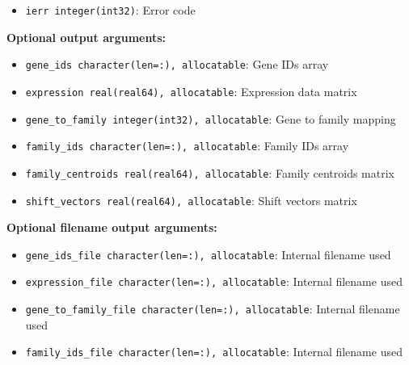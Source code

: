 \begin{enumerate}
\begin{itemize}
\begin{itemize}
                    \item \texttt{ierr integer(int32)}: Error code
                  \end{itemize}
                  \textbf{Optional output arguments:}
                  \begin{itemize}
                    \item \texttt{gene\_ids character(len=:), allocatable}: Gene IDs array
                          
                    \item \texttt{expression real(real64), allocatable}: Expression data
                          matrix
                          
                    \item \texttt{gene\_to\_family integer(int32), allocatable}: Gene to
                          family mapping
                          
                    \item \texttt{family\_ids character(len=:), allocatable}: Family IDs
                          array
                          
                    \item \texttt{family\_centroids real(real64), allocatable}: Family centroids
                          matrix
                          
                    \item \texttt{shift\_vectors real(real64), allocatable}: Shift vectors
                          matrix
                  \end{itemize}
                  \textbf{Optional filename output arguments:}
                  \begin{itemize}
                    \item \texttt{gene\_ids\_file character(len=:), allocatable}: Internal
                          filename used
                          
                    \item \texttt{expression\_file character(len=:), allocatable}: Internal
                          filename used
                          
                    \item \texttt{gene\_to\_family\_file character(len=:), allocatable}:
                          Internal filename used
                          
                    \item \texttt{family\_ids\_file character(len=:), allocatable}: Internal
                          filename used
                          

\end{itemize}
\end{itemize}
\end{enumerate}
